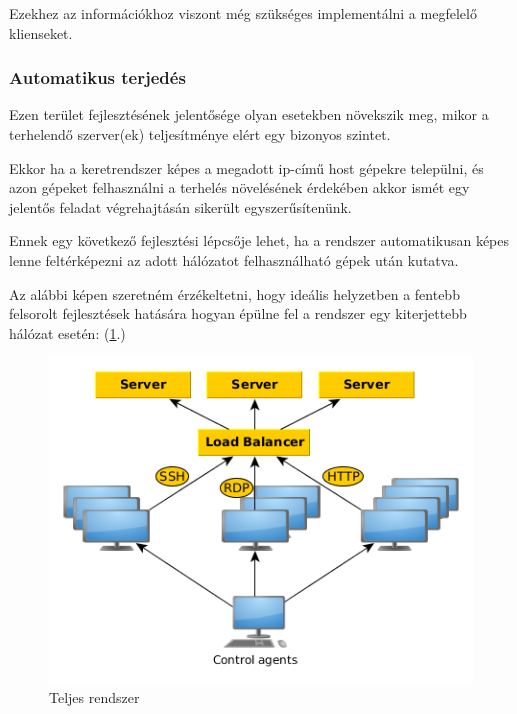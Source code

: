 \documentclass[a4paper,12pt,oneside]{report}
\begin{document}
Ezekhez az információkhoz viszont még szükséges implementálni a megfelelő klienseket.

\subsubsection{Automatikus terjedés}

Ezen terület fejlesztésének jelentősége olyan esetekben növekszik meg, mikor a terhelendő szerver(ek) teljesítménye elért egy bizonyos szintet.

Ekkor ha a keretrendszer képes a megadott ip-című host gépekre települni, és azon gépeket felhasználni a terhelés növelésének érdekében akkor ismét egy jelentős feladat végrehajtásán sikerült egyszerűsítenünk.

Ennek egy következő fejlesztési lépcsője lehet, ha a rendszer automatikusan képes lenne feltérképezni az adott hálózatot felhasználható gépek után kutatva.

Az alábbi képen szeretném érzékeltetni, hogy ideális helyzetben a fentebb felsorolt fejlesztések hatására hogyan épülne fel a rendszer egy kiterjettebb hálózat esetén: (\ref{fig:generator}.)

\begin{figure}[h]
	  \includegraphics[width=12cm,keepaspectratio]{generator.png}
		  \caption{Teljes rendszer}
	  \label{fig:generator}
\end{figure}


%
%
\end{document}
